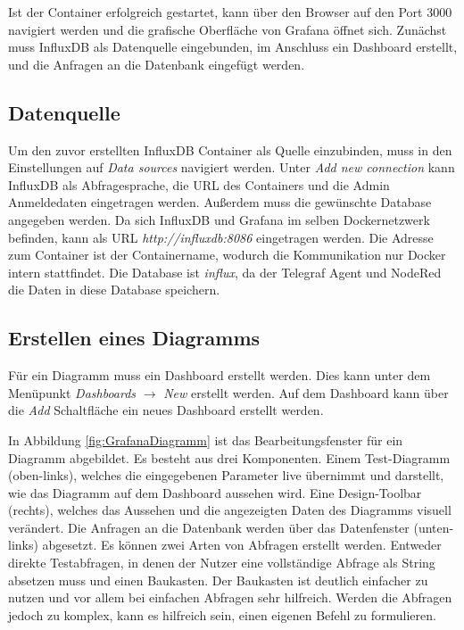 \documentclass[a4paper, 12pt, oneside, toc=listofnumbered, bibliography=totoc]{scrbook}
\begin{document}
		
		
		Ist der Container erfolgreich gestartet, kann über den Browser auf den Port 3000 navigiert werden und die grafische Oberfläche von Grafana öffnet sich. Zunächst muss InfluxDB als Datenquelle eingebunden, im Anschluss ein Dashboard erstellt, und die Anfragen an die Datenbank eingefügt werden. 
		
		\subsection{Datenquelle}
		
		Um den zuvor erstellten InfluxDB Container als Quelle einzubinden, muss in den Einstellungen auf \textit{Data sources} navigiert werden. Unter \textit{Add new connection} kann InfluxDB als Abfragesprache, die URL des Containers und die Admin Anmeldedaten eingetragen werden. Außerdem muss die gewünschte Database angegeben werden. Da sich InfluxDB und Grafana im selben Dockernetzwerk befinden, kann als URL \textit{http://influxdb:8086} eingetragen werden. Die Adresse zum Container ist der Containername, wodurch die Kommunikation nur Docker intern stattfindet. Die Database ist \textit{influx}, da der Telegraf Agent und NodeRed die Daten in diese Database speichern.
		
		
		\subsection{Erstellen eines Diagramms}
		
		Für ein Diagramm muss ein Dashboard erstellt werden. Dies kann unter dem Menüpunkt \textit{Dashboards} $\rightarrow$ \textit{New} erstellt werden. Auf dem Dashboard kann über die \textit{Add} Schaltfläche ein neues Dashboard erstellt werden.
		
		In Abbildung \ref{fig:GrafanaDiagramm} ist das Bearbeitungsfenster für ein Diagramm abgebildet. Es besteht aus drei Komponenten. Einem Test-Diagramm (oben-links), welches die eingegebenen Parameter live übernimmt und darstellt, wie das Diagramm auf dem Dashboard aussehen wird. Eine Design-Toolbar (rechts), welches das Aussehen und die angezeigten Daten des Diagramms visuell verändert. Die Anfragen an die Datenbank werden über das Datenfenster (unten-links) abgesetzt. Es können zwei Arten von Abfragen erstellt werden. Entweder direkte Testabfragen, in denen der Nutzer eine vollständige Abfrage als String absetzen muss und einen Baukasten. Der Baukasten ist deutlich einfacher zu nutzen und vor allem bei einfachen Abfragen sehr hilfreich. Werden die Abfragen jedoch zu komplex, kann es hilfreich sein, einen eigenen Befehl zu formulieren.
		
\end{document}
